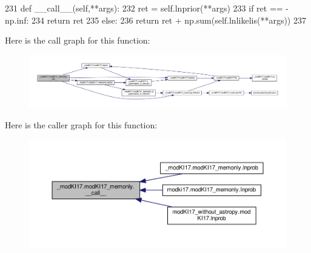 \begin{DoxyCode}
231     \textcolor{keyword}{def }\_\_call\_\_(self,**args):
232         ret = self.lnprior(**args)
233         \textcolor{keywordflow}{if} ret == -np.inf:
234             \textcolor{keywordflow}{return} ret
235         \textcolor{keywordflow}{else}:
236             \textcolor{keywordflow}{return} ret + np.sum(self.lnlikelis(**args)) 
237         
\end{DoxyCode}
Here is the call graph for this function\+:\nopagebreak
\begin{figure}[H]
\begin{center}
\leavevmode
\includegraphics[width=350pt]{d9/d8f/class__modKI17_1_1modKI17__memonly_a71d2532d1eaf5b5da0ba44fbaa4c7da5_cgraph}
\end{center}
\end{figure}
Here is the caller graph for this function\+:\nopagebreak
\begin{figure}[H]
\begin{center}
\leavevmode
\includegraphics[width=350pt]{d9/d8f/class__modKI17_1_1modKI17__memonly_a71d2532d1eaf5b5da0ba44fbaa4c7da5_icgraph}
\end{center}
\end{figure}
\mbox{\label{class__modKI17_1_1modKI17__memonly_a7e4159dc246bb2ff5aa958aab45e40d8}} 
